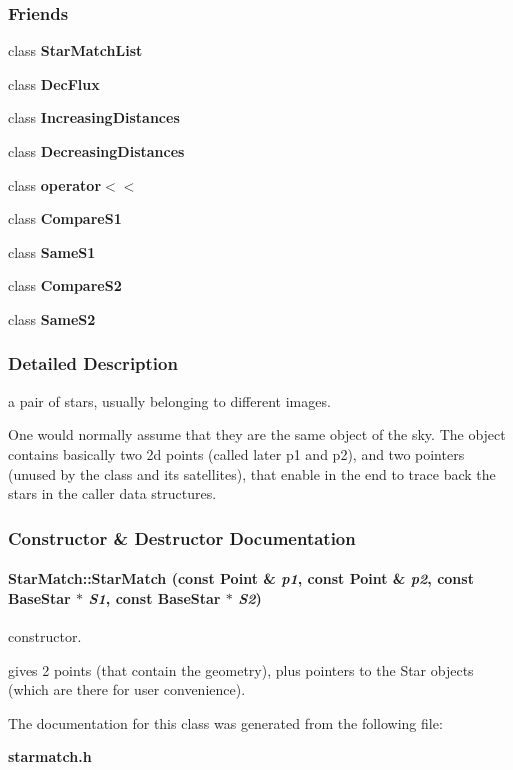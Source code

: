 \subsubsection*{Friends}
\begin{CompactItemize}
\item 
class {\bf Star\-Match\-List}
\item 
class {\bf Dec\-Flux}
\item 
class {\bf Increasing\-Distances}
\item 
class {\bf Decreasing\-Distances}
\item 
class {\bf operator$<$$<$}
\item 
class {\bf Compare\-S1}
\item 
class {\bf Same\-S1}
\item 
class {\bf Compare\-S2}
\item 
class {\bf Same\-S2}
\end{CompactItemize}


\subsubsection{Detailed Description}
a pair of stars, usually belonging to different images.

One would normally assume that they are the same object of the sky. The object contains basically two 2d points (called later p1 and p2), and two pointers (unused by the class and its satellites), that enable in the end to trace back the stars in the caller data structures. 



\subsubsection{Constructor \& Destructor Documentation}
\paragraph{\setlength{\rightskip}{0pt plus 5cm}Star\-Match::Star\-Match (const {\bf Point} \& {\em p1}, const {\bf Point} \& {\em p2}, const {\bf Base\-Star} $\ast$ {\em S1}, const {\bf Base\-Star} $\ast$ {\em S2})\hspace{0.3cm}{\tt  [inline]}}\hfill\label{class_starmatch_a0}


constructor.

gives 2 points (that contain the geometry), plus pointers to the Star objects (which are there for user convenience). 

The documentation for this class was generated from the following file:\begin{CompactItemize}
\item 
{\bf starmatch.h}\end{CompactItemize}
